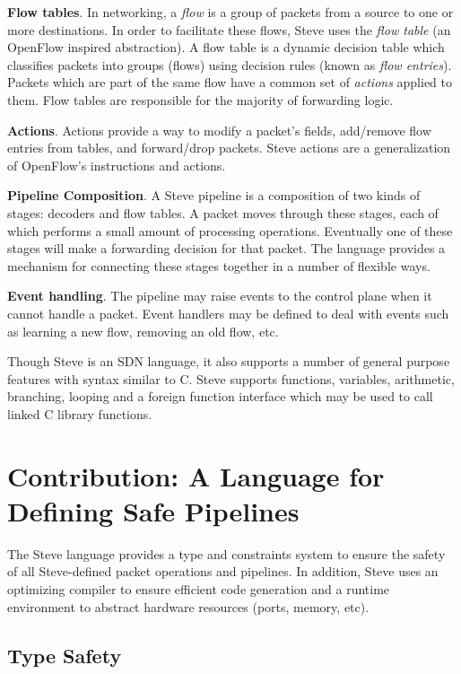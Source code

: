 \textbf{Flow tables}. 
In networking, a \emph{flow} is a group of packets from a source to one or more 
destinations. In order to facilitate these flows, Steve uses the
\emph{flow table} (an OpenFlow inspired abstraction). 
A flow table is a dynamic
decision table which classifies packets into groups (flows) using
decision rules (known as \emph{flow entries}).
Packets which are part of the same flow have a common set of \emph{actions}
applied to them.
Flow tables are responsible for the majority of forwarding logic.

\textbf{Actions}. Actions provide a way to modify a packet's fields, add/remove
flow entries from tables, and forward/drop packets. Steve actions are a generalization
of OpenFlow's instructions and actions.

\textbf{Pipeline Composition}. A Steve pipeline is a composition of two kinds of stages:
decoders and flow tables.
A packet moves through these stages, each of which performs a small amount of processing operations.
Eventually one of these stages will make a forwarding decision for that packet.
The language provides a mechanism for connecting these
stages together in a number of flexible ways.

\textbf{Event handling}. The pipeline may raise events to the control plane when it cannot handle a
packet. Event handlers may be defined to deal with events such as learning a new
flow, removing an old flow, etc.

Though Steve is an SDN language, it also supports a number of general purpose
features with syntax similar to C. 
Steve supports functions, variables, arithmetic, branching, 
looping and a foreign function interface which may be used to call linked C 
library functions.

\section{Contribution: A Language for Defining Safe Pipelines}

The Steve language provides a type and constraints system to ensure the safety
of all Steve-defined packet operations and pipelines.
In addition, Steve uses an optimizing compiler to ensure efficient code generation
and a runtime environment to abstract hardware resources (ports, memory, etc).

\subsection{Type Safety}

